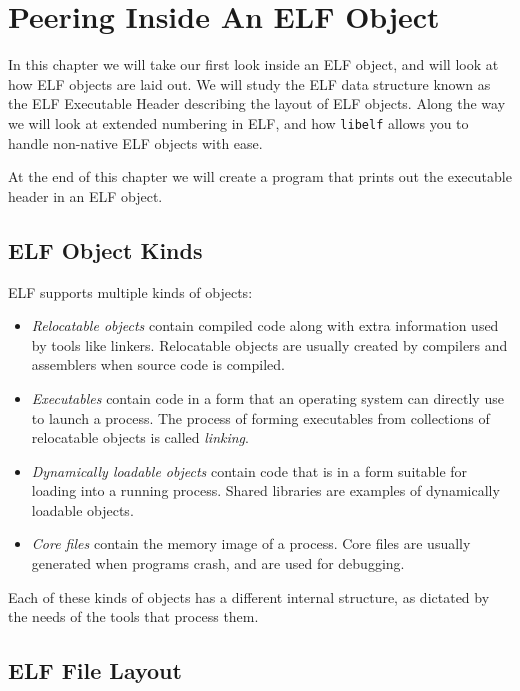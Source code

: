 \documentclass[a4paper,pdftex]{book}
\newcommand{\firstterm}[1]{\textit{#1}}
\newcommand{\library}[1]{\texttt{#1}}
\newcommand{\elfdatastructure}[1]{\textsf{#1}}
\begin{document}
\chapter{Peering Inside An ELF Object}\label{chap.peering-inside}

In this chapter we will take our first look inside an ELF object, and
will look at how ELF objects are laid out. We will study the ELF data
structure known as the ELF \elfdatastructure{Executable Header}
describing the layout of ELF objects.  Along the way we will look at
extended numbering in ELF, and how \library{libelf} allows you to
handle non-native ELF objects with ease.

At the end of this chapter we will create a program that prints out
the executable header in an ELF object.

\section{ELF Object Kinds}
ELF supports multiple kinds of objects:

\begin{itemize}
\item \firstterm{Relocatable objects}
  contain compiled code along with extra information used by tools
  like linkers. Relocatable objects are usually created by compilers
  and assemblers when source code is compiled.
\item \firstterm{Executables} contain
  code in a form that an operating system can directly use to launch a
  process.  The process of forming executables from collections of
  relocatable objects is called
  \firstterm{linking}.
\item \firstterm{Dynamically loadable objects} contain code that is in a form suitable for
  loading into a running process. Shared
  libraries are examples of dynamically loadable
  objects.
\item \firstterm{Core files} contain the memory
  image of a process. Core files are usually generated when programs
  crash, and are used for debugging.
\end{itemize}

Each of these kinds of objects has a different internal structure, as
dictated by the needs of the tools that process them.

\section{ELF File Layout}
\end{document}
